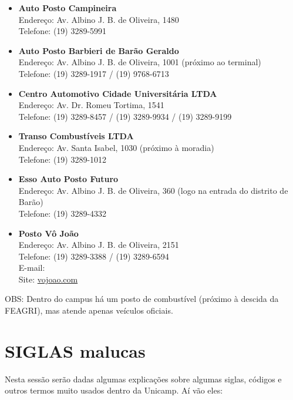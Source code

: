 \begin{itemize}
\item   \textbf{Auto Posto Campineira}
		\\Endereço: Av. Albino J. B. de Oliveira, 1480
		\\Telefone: (19) 3289-5991

\item   \textbf{Auto Posto Barbieri de Barão Geraldo}
		\\Endereço: Av. Albino J. B. de Oliveira, 1001 (próximo ao terminal)
		\\Telefone: (19) 3289-1917 / (19) 9768-6713

\item   \textbf{Centro Automotivo Cidade Universitária LTDA}
		\\Endereço: Av. Dr. Romeu Tortima, 1541
		\\Telefone: (19) 3289-8457 / (19) 3289-9934 / (19) 3289-9199

\item   \textbf{Transo Combustíveis LTDA}
		\\Endereço: Av. Santa Isabel, 1030 (próximo à moradia)
		\\Telefone: (19) 3289-1012

\item   \textbf{Esso Auto Posto Futuro}
		\\Endereço: Av. Albino J. B. de Oliveira, 360 (logo na entrada do distrito de Barão)
		\\Telefone: (19) 3289-4332

\item   \textbf{Posto Vô João}
		\\Endereço: Av. Albino J. B. de Oliveira, 2151
		\\Telefone: (19) 3289-3388 / (19) 3289-6594
        \\E-mail: 
		\\Site: \url{vojoao.com}
\end{itemize}

OBS: Dentro do campus há um posto de combustível (próximo à descida da FEAGRI),
mas atende apenas veículos oficiais.

\newpage
\section{SIGLAS malucas}

Nesta sessão serão dadas algumas explicações sobre algumas siglas, códigos
e outros termos muito usados dentro da Unicamp. Aí vão eles:

